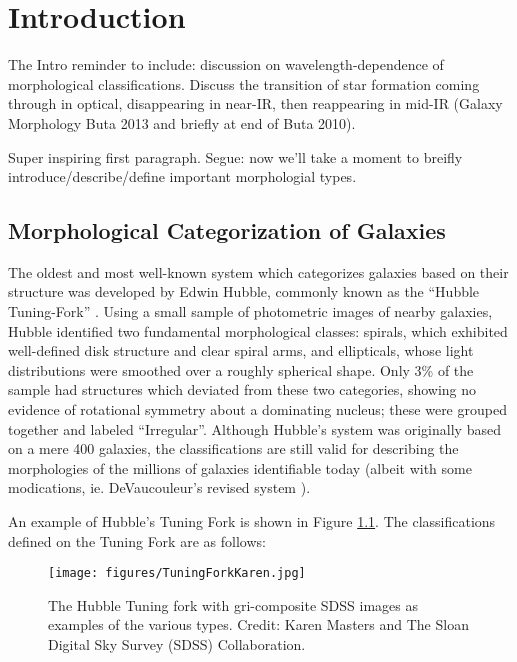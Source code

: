 \chapter{Introduction}
\label{chap:intro}

The Intro
reminder to include: discussion on wavelength-dependence of morphological classifications. Discuss the transition of star formation coming through in optical, disappearing in near-IR, then reappearing in mid-IR (Galaxy Morphology Buta 2013 and briefly at end of Buta 2010). 

Super inspiring first paragraph. Segue: now we'll take a moment to breifly introduce/describe/define important morphologial types. 

\section{Morphological Categorization of Galaxies}

The oldest and most well-known system which categorizes galaxies based on their structure was developed by Edwin Hubble, commonly known as the ``Hubble Tuning-Fork'' \citep{Hubble1926}. Using a small sample of photometric images of nearby galaxies, Hubble identified two fundamental morphological classes: spirals, which exhibited well-defined disk structure and clear spiral arms, and ellipticals, whose light distributions were smoothed over a roughly spherical shape. Only 3\% of the sample had structures which deviated from these two categories, showing no evidence of rotational symmetry about a dominating nucleus; these were grouped together and labeled ``Irregular''. Although Hubble's system was originally based on a mere 400 galaxies, the classifications are still valid for describing the morphologies of the millions of galaxies identifiable today (albeit with some modications, ie. DeVaucouleur's revised system \citep{DeVaucouleurs1963}).

An example of Hubble's Tuning Fork is shown in Figure \ref{fig:tuningfork}. The classifications defined on the Tuning Fork are as follows:

\begin{figure}
\centering
\texttt{[image: figures/TuningForkKaren.jpg]}
\label{fig:tuningfork}
\caption{The Hubble Tuning fork with gri-composite SDSS images as examples of the various types. Credit: Karen Masters and The Sloan Digital Sky Survey (SDSS) Collaboration.}
\end{figure}

